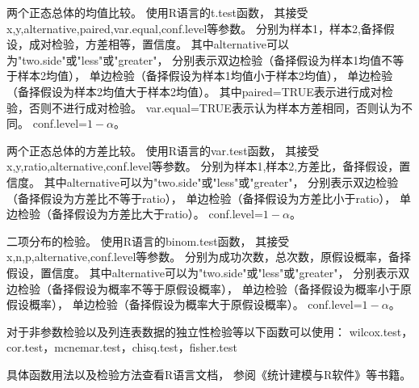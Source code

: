 两个正态总体的均值比较。\newline
使用R语言的t.test函数，
其接受x,y,alternative,paired,var.equal,conf.level等参数。
分别为样本1，样本2,备择假设，成对检验，方差相等，置信度。
其中alternative可以为"two.side"或"less"或"greater"，
分别表示双边检验（备择假设为样本1均值不等于样本2均值），
单边检验（备择假设为样本1均值小于样本2均值），
单边检验（备择假设为样本2均值大于样本2均值）。
其中paired=TRUE表示进行成对检验，否则不进行成对检验。
var.equal=TRUE表示认为样本方差相同，否则认为不同。
conf.level=$1-\alpha$。

两个正态总体的方差比较。\newline
使用R语言的var.test函数，
其接受x,y,ratio,alternative,conf.level等参数。
分别为样本1,样本2,方差比，备择假设，置信度。
其中alternative可以为"two.side"或"less"或"greater"，
分别表示双边检验（备择假设为方差比不等于ratio），
单边检验（备择假设为方差比小于ratio），
单边检验（备择假设为方差比大于ratio）。
conf.level=$1-\alpha$。

二项分布的检验。\newline
使用R语言的binom.test函数，
其接受x,n,p,alternative,conf.level等参数。
分别为成功次数，总次数，原假设概率，备择假设，置信度。
其中alternative可以为"two.side"或"less"或"greater"，
分别表示双边检验（备择假设为概率不等于原假设概率），
单边检验（备择假设为概率小于原假设概率），
单边检验（备择假设为概率大于原假设概率）。
conf.level=$1-\alpha$。

对于非参数检验以及列连表数据的独立性检验等以下函数可以使用：\newline
wilcox.test，cor.test，mcnemar.test，chisq.test，fisher.test

具体函数用法以及检验方法查看R语言文档，
参阅《统计建模与R软件》等书籍。

